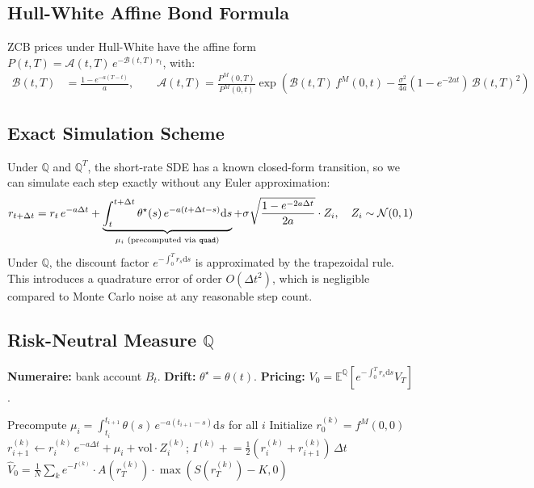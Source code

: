 \documentclass[12pt, a4paper]{article}
\newcommand{\E}{\mathbb{E}}
\newcommand{\Q}{\mathbb{Q}}
\newcommand{\diff}{\mathrm{d}}
\begin{document}
\subsection{Hull-White Affine Bond Formula}

ZCB prices under Hull-White have the affine form $P(t,T) = \mathcal{A}(t,T)\,e^{-\mathcal{B}(t,T)\,r_t}$, with:
\begin{align}
\mathcal{B}(t,T) &= \frac{1-e^{-a(T-t)}}{a}, \qquad
\mathcal{A}(t,T) = \frac{P^M(0,T)}{P^M(0,t)} \exp\!\left(\mathcal{B}(t,T)\, f^M(0,t) - \frac{\sigma^2}{4a}(1-e^{-2at})\,\mathcal{B}(t,T)^2\right)
\end{align}

\subsection{Exact Simulation Scheme}

Under $\Q$ and $\Q^T$, the short-rate SDE has a known closed-form transition, so we can simulate each step exactly without any Euler approximation:
\begin{equation}
r_{t+\Delta t} = r_t\, e^{-a\Delta t} + \underbrace{\int_t^{t+\Delta t} \theta^\star(s)\, e^{-a(t+\Delta t - s)}\diff s}_{\mu_i \text{ (precomputed via \texttt{quad})}} + \sigma\sqrt{\frac{1-e^{-2a\Delta t}}{2a}} \cdot Z_i, \quad Z_i \sim \mathcal{N}(0,1)
\end{equation}
Under $\Q$, the discount factor $e^{-\int_0^T r_s\diff s}$ is approximated by the trapezoidal rule. This introduces a quadrature error of order $O(\Delta t^2)$, which is negligible compared to Monte Carlo noise at any reasonable step count.

\subsection{Risk-Neutral Measure $\Q$}

\textbf{Numeraire:} bank account $B_t$. \textbf{Drift:} $\theta^\star = \theta(t)$. \textbf{Pricing:} $V_0 = \E^{\Q}[e^{-\int_0^T r_s\diff s} V_T]$.

\begin{algorithm}[H]
\caption{Monte Carlo under $\Q$ (exact scheme)}
\begin{algorithmic}[1]
\State Precompute $\mu_i = \int_{t_i}^{t_{i+1}} \theta(s)\,e^{-a(t_{i+1}-s)}\diff s$ for all $i$
\State Initialize $r_0^{(k)} = f^M(0,0)$
    \State $r_{i+1}^{(k)} \leftarrow r_i^{(k)}\,e^{-a\Delta t} + \mu_i + \text{vol}\cdot Z_i^{(k)}$; \quad $I^{(k)} \mathrel{+}= \tfrac{1}{2}(r_i^{(k)} + r_{i+1}^{(k)})\,\Delta t$
\EndFor
\State $\hat{V}_0 = \frac{1}{N}\sum_k e^{-I^{(k)}} \cdot A(r_T^{(k)})\cdot\max(S(r_T^{(k)})-K, 0)$
\end{algorithmic}
\end{algorithm}
\end{document}
